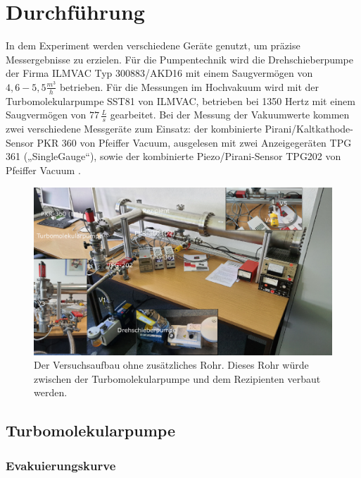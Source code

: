\section{Durchführung}
\label{sec:Durchführung}

In dem Experiment werden verschiedene Geräte genutzt, um präzise Messergebnisse zu erzielen.
Für die Pumpentechnik wird die Drehschieberpumpe der Firma ILMVAC Typ 300883/AKD16 mit einem Saugvermögen von \(4,6-5,5 \frac{m^3}{h}\)
betrieben. Für die Messungen im Hochvakuum wird mit der Turbomolekularpumpe SST81 von ILMVAC, betrieben bei 1350 Hertz mit
einem Saugvermögen von \(77 \, \frac{L}{s}\) gearbeitet. Bei der Messung der Vakuumwerte kommen zwei verschiedene Messgeräte zum Einsatz:
der kombinierte Pirani/Kaltkathode-Sensor PKR 360 von Pfeiffer Vacuum, ausgelesen mit zwei Anzeigegeräten TPG 361 („SingleGauge“),
sowie der kombinierte Piezo/Pirani-Sensor TPG202 von Pfeiffer Vacuum
\cite{delta_tu_dortmund}.


\begin{figure}
    \includegraphics[width=\textwidth]{bilder/versuchsaufbau_anleitung.pdf}
    \caption{Der Versuchsaufbau ohne zusätzliches Rohr. Dieses Rohr würde zwischen der Turbomolekularpumpe und dem Rezipienten verbaut werden.}
\end{figure}


\subsection{Turbomolekularpumpe}
\subsubsection{Evakuierungskurve}


